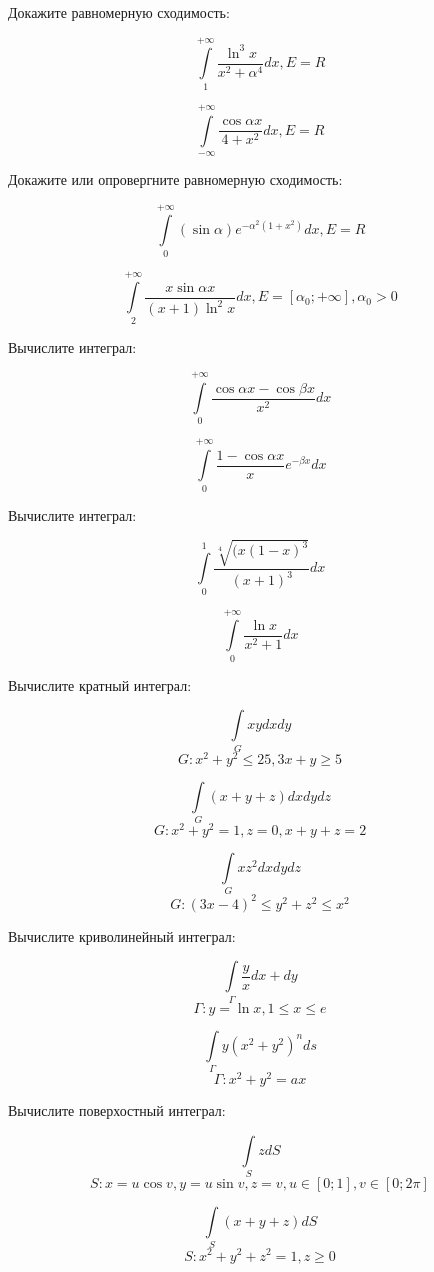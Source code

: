 \documentclass[russian]{article}
\begin{document}
 Докажите равномерную сходимость:
 
 $$\int\limits_1^{+\infty} \frac{\ln^3 x}{x^2 + \alpha^4} dx, E = R$$
 
 $$\int\limits_{-\infty}^{+\infty} \frac{\cos\alpha x}{4 + x^2}dx, E = R$$
 
 Докажите или опровергните равномерную сходимость:
 
 $$\int\limits_0^{+\infty} (\sin\alpha) e^{-\alpha^2(1 + x^2)} dx, E = R$$
 
 $$\int\limits_2^{+\infty} \frac{x\sin\alpha x}{(x + 1) \ln^2 x} dx, E = [\alpha_0; +\infty], \alpha_0 > 0$$
 
 Вычислите интеграл:
 
 $$\int\limits_0^{+\infty} \frac{\cos\alpha x - \cos\beta x}{x^2} dx$$
 
 $$\int\limits_0^{+\infty} \frac{1 - \cos\alpha x}{x} e^{-\beta x} dx$$
 
 Вычислите интеграл:
 
 $$\int\limits_0^1 \frac{\sqrt[4]{(x ( 1 - x)^3}}{(x + 1)^3 } dx$$
 
 $$\int\limits_0^{+\infty} \frac{\ln x}{x^2 + 1} dx$$
 
 Вычислите кратный интеграл:
 
 $$\int\limits_G xy dxdy$$
 $$G: x^2 + y^2 \le 25, 3x + y \ge 5$$
 
 $$\int\limits_G (x + y + z) dxdydz$$
 $$G: x^2 + y^2 = 1, z = 0, x + y + z = 2$$
 
 $$\int\limits_G xz^2 dxdydz$$
 $$G: (3x - 4)^2 \le y^2 + z^2 \le x^2$$
 
 Вычислите криволинейный интеграл:
 
 $$\int\limits_\Gamma \frac{y}{x} dx + dy$$
 $$\Gamma: y = \ln x, 1 \le x \le e$$
 
 $$\int\limits_\Gamma y(x^2 + y^2)^n ds$$
 $$\Gamma: x^2 + y^2 = ax$$
 
 Вычислите поверхостный интеграл:
 
 $$\int\limits_S z dS$$
 $$S: x= u \cos v, y = u \sin v, z = v, u \in [0;1], v \in [0;2\pi]$$
 
 $$\int\limits_S (x + y + z) dS$$
 $$S: x^2 + y^2 + z^2 = 1, z \ge 0$$
 
\end{document}
